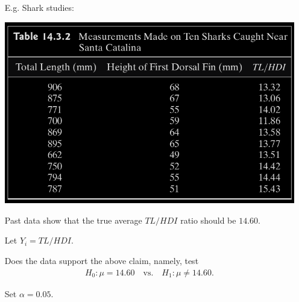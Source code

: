 \begin{frame}[fragile]
\begin{itemize}
	\item[E.g.] Shark studies:
	\begin{center}
		\includegraphics[scale=0.25]{Codes/Table14-3-2.png}
	\end{center}
	\item[] Past data show that the true average $TL/HDI$ ratio should be $14.60$.
	\item[] Let $Y_i=TL/HDI$.
	\item[] Does the data support the above claim, namely, test
	\begin{align*}
		H_0:\mu=14.60 \quad \text{vs.} \quad H_1:\mu\ne 14.60.
	\end{align*}
	\item[] Set $\alpha=0.05$.
\end{itemize}
\end{frame}
